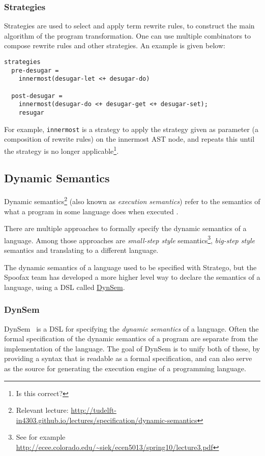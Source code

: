 \subsubsection{Strategies}
\label{sec:orgheadline5}
Strategies are used to select and apply term rewrite rules, to
construct the main algorithm of the program transformation. One can
use multiple combinators to compose rewrite rules and other
strategies. An example is given below:
\begin{verbatim}
strategies
  pre-desugar =
    innermost(desugar-let <+ desugar-do)

  post-desugar =
    innermost(desugar-do <+ desugar-get <+ desugar-set);
    resugar
\end{verbatim}
For example, \texttt{innermost} is a strategy to apply the strategy given as
parameter (a composition of rewrite rules) on the innermost AST node,
and repeats this until the strategy is no longer applicable\footnote{Is
this correct?}.
\subsection{Dynamic Semantics}
\label{sec-dynamic-semantics}
Dynamic semantics\footnote{Relevant lecture:
\url{http://tudelft-in4303.github.io/lectures/specification/dynamic-semantics}}
(also known as \emph{execution semantics}) refer to the semantics of what a
program in some language does when executed \footnotemark[2]{}.

There are multiple approaches to formally specify the dynamic
semantics of a language. Among those approaches are \emph{small-step style}
semantics\footnote{See for example
\url{http://ecee.colorado.edu/~siek/ecen5013/spring10/lecture3.pdf}},
\emph{big-step style} semantics and translating to a different language.

The dynamic semantics of a language used to be specified with
Stratego, but the Spoofax team has developed a more higher level way
to declare the semantics of a language, using a DSL called \hyperref[ssec-dynsem]{DynSem}.
\subsubsection{DynSem}
\label{ssec-dynsem}
DynSem~\cite{VerguNV15} is a DSL for specifying the \emph{dynamic semantics} of a
language.  Often the formal specification of the dynamic semantics of
a program are separate from the implementation of the language. The
goal of DynSem is to unify both of these, by providing a syntax that
is readable as a formal specification, and can also serve as the
source for generating the execution engine of a programming language.
